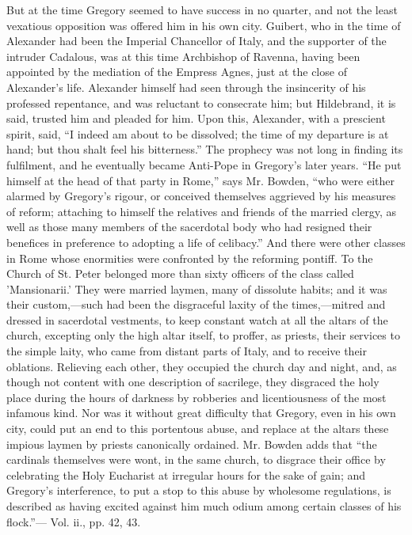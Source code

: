 But at the time Gregory seemed to have success in
no quarter, and not the least vexatious opposition was offered
him in his own city. Guibert, who in the time of Alexander had been
the Imperial Chancellor of Italy, and the supporter of the intruder
Cadalous, was at this time Archbishop of Ravenna, having been
appointed by the mediation of the Empress Agnes, just at the close of
Alexander's life. Alexander himself had seen through the insincerity
of his professed repentance, and was reluctant to consecrate him; but
Hildebrand, it is said, trusted him and pleaded for him. Upon this,
Alexander, with a prescient spirit, said, ``I indeed am about to be
dissolved; the time of my departure is at hand; but thou shalt feel
his bitterness.'' The prophecy was not long in finding its fulfilment,
and he eventually became Anti-Pope in Gregory's later years. ``He put
himself at the head of that party in Rome,'' says Mr. Bowden, ``who were
either alarmed by Gregory's rigour, or conceived themselves aggrieved
by his measures of reform; attaching to himself the relatives and
friends of the married clergy, as well as those many members of the
sacerdotal body who had resigned their benefices in preference to
adopting a life of celibacy.'' And there were other classes in Rome
whose enormities were confronted by the reforming pontiff. To the
Church of St. Peter belonged more than sixty officers of the class
called 'Mansionarii.' They were married laymen, many of dissolute
habits; and it was their custom,—such had been the disgraceful
laxity of the times,—mitred and dressed in sacerdotal vestments, to
keep constant watch at all the altars of the church, excepting only
the high altar itself, to proffer, as priests, their services to the
simple laity, who came from distant parts of Italy, and to receive
their oblations. Relieving each other, they occupied the church day
and night, and, as though not content with one description of
sacrilege, they disgraced the holy place during the hours of darkness
by robberies and licentiousness of the most infamous kind. Nor was it
without great difficulty that Gregory, even in his own city, could put
an end to this portentous abuse, and replace at the altars these
impious laymen by priests canonically ordained. Mr. Bowden adds that ``the
cardinals themselves were wont, in the same church, to disgrace their
office by celebrating the Holy Eucharist at irregular hours for the
sake of gain; and Gregory's interference, to put a stop to this abuse
by wholesome regulations, is described as having excited against him
much odium among certain classes of his flock.''— Vol. ii., pp. 42,
43.

